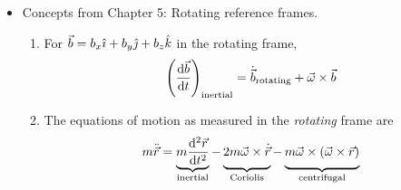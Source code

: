 \documentclass[../notes.tex]{subfiles}
\begin{document}
\begin{itemize}
\begin{enumerate}
\begin{itemize}
        \end{itemize}
    \end{enumerate}
    \item Concepts from Chapter 5: Rotating reference frames.
    \begin{enumerate}
        \item For $\vec{b}=b_x\hat{\imath}+b_y\hat{\jmath}+b_z\hat{k}$ in the rotating frame,
        \begin{equation*}
            \left( \dv{\vec{b}}{t} \right)_\text{inertial} = \dot{\vec{b}}_\text{rotating}+\vec{\omega}\times\vec{b}
        \end{equation*}
        \item The equations of motion as measured in the \emph{rotating} frame are
        \begin{equation*}
            m\ddot{\vec{r}} = \underbrace{m\dv[2]{\vec{r}}{t}}_\text{inertial}-\underbrace{2m\vec{\omega}\times\dot{\vec{r}}\vphantom{\dv[2]{\vec{r}}{t}}}_\text{Coriolis}-\underbrace{m\vec{\omega}\times(\vec{\omega}\times\vec{r})\vphantom{\dv[2]{\vec{r}}{t}}}_\text{centrifugal}
        \end{equation*}
    \end{enumerate}
\end{itemize}
\end{document}
